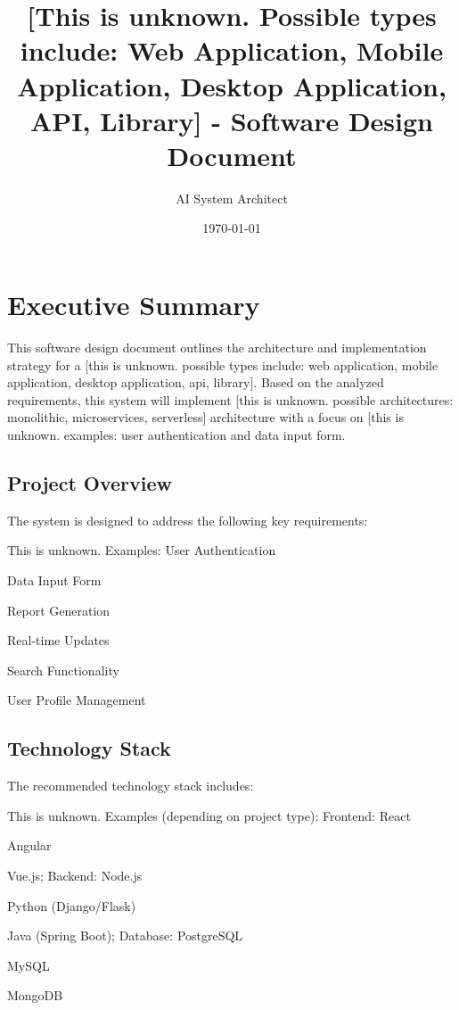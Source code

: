 \documentclass[11pt,a4paper,oneside]{article}
\title{\textbf{[This is unknown.  Possible types include: Web Application, Mobile Application, Desktop Application, API, Library] - Software Design Document}}
\author{AI System Architect}
\date{\today}
\begin{document}
\maketitle
\thispagestyle{empty}
\newpage

\tableofcontents
\newpage

\section{Executive Summary}

This software design document outlines the architecture and implementation strategy for a [this is unknown.  possible types include: web application, mobile application, desktop application, api, library]. Based on the analyzed requirements, this system will implement [this is unknown.  possible architectures: monolithic, microservices, serverless] architecture with a focus on [this is unknown.  examples: user authentication and data input form.

\subsection{Project Overview}

The system is designed to address the following key requirements:
\item [This is unknown. Examples: User Authentication
\item Data Input Form
\item Report Generation
\item Real-time Updates
\item Search Functionality
\item User Profile Management]

\subsection{Technology Stack}

The recommended technology stack includes:
\item [This is unknown. Examples (depending on project type): Frontend: React
\item Angular
\item Vue.js; Backend: Node.js
\item Python (Django/Flask)
\item Java (Spring Boot); Database: PostgreSQL
\item MySQL
\item MongoDB]
\end{document}
